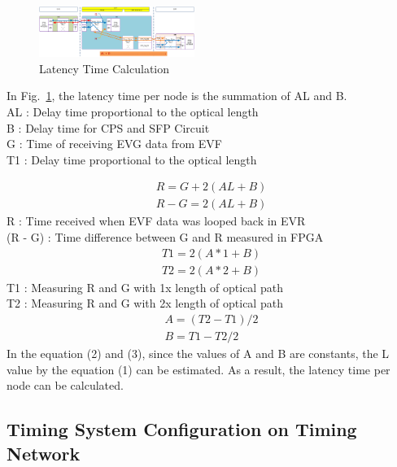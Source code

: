 \documentclass[journal,reqno]{IEEEtran}
\begin{document}
\begin{figure}[!htb]
	\centering
	\includegraphics*[width=0.45\textwidth, height=0.23\textwidth]{img16.png}
	\caption{Latency Time Calculation}
	\label{latency_time}
\end{figure}
In Fig.~\ref{latency_time}, the latency time per node is the summation of AL and B.\\
\noindent
AL : Delay time proportional to the optical length\\
\space B  : Delay time for CPS and SFP Circuit \\
\space G  : Time of receiving EVG data from EVF \\
\space T1 : Delay time proportional to the optical length

\begin {align} \label{eqn_r}
R = G + 2(AL + B) \nonumber \\
R - G = 2(AL + B) 
\end {align}
R : Time received when EVF data was looped back in EVR \\
(R - G) : Time difference between G and R measured in FPGA
\begin {align*}
T1 = 2(A*1 + B) \\
T2 = 2(A*2 + B)
\end {align*}
T1 : Measuring R and G with 1x length of optical path \\
T2 : Measuring R and G with 2x length of optical path
\begin {align}
A = (T2 - T1)/2 \\
B = T1 - T2/2
\end {align}
In the equation (2) and (3), since the values of A and B are constants, the L value by the equation (1) can be estimated.
As a result, the latency time per node can be calculated.

\subsection{Timing System Configuration on Timing Network}
\end{document}
